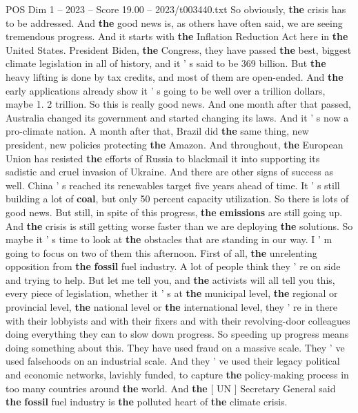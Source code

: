 \begin{textsample}{POS Dim 1 – 2023 – Score 19.00 – 2023/t003440.txt}
So obviously, \textbf{the} crisis has to be addressed.
And \textbf{the} good news is, as others have often said, we are seeing tremendous progress.
And it starts with \textbf{the} Inflation Reduction Act here in \textbf{the} United States.
President Biden, \textbf{the} Congress, they have passed \textbf{the} best, biggest climate legislation in all of history, and it ' s said to be 369 billion.
But \textbf{the} heavy lifting is done by tax credits, and most of them are open-ended.
And \textbf{the} early applications already show it ' s going to be well over a trillion dollars, maybe 1. 2 trillion.
So this is really good news.
And one month after that passed, Australia changed its government and started changing its laws.
And it ' s now a pro-climate nation.
A month after that, Brazil did \textbf{the} same thing, new president, new policies protecting \textbf{the} Amazon.
And throughout, \textbf{the} European Union has resisted \textbf{the} efforts of Russia to blackmail it into supporting its sadistic and cruel invasion of Ukraine.
And there are other signs of success as well.
China ' s reached its renewables target five years ahead of time.
It ' s still building a lot of \textbf{coal}, but only 50 percent capacity utilization.
So there is lots of good news.
But still, in spite of this progress, \textbf{the} \textbf{emissions} are still going up.
And \textbf{the} crisis is still getting worse faster than we are deploying \textbf{the} solutions.
So maybe it ' s time to look at \textbf{the} obstacles that are standing in our way.
I ' m going to focus on two of them this afternoon.
First of all, \textbf{the} unrelenting opposition from \textbf{the} \textbf{fossil} fuel industry.
A lot of people think they ' re on side and trying to help.
But let me tell you, and \textbf{the} activists will all tell you this, every piece of legislation, whether it ' s at \textbf{the} municipal level, \textbf{the} regional or provincial level, \textbf{the} national level or \textbf{the} international level, they ' re in there with their lobbyists and with their fixers and with their revolving-door colleagues doing everything they can to slow down progress.
So speeding up progress means doing something about this.
They have used fraud on a massive scale.
They ' ve used falsehoods on an industrial scale.
And they ' ve used their legacy political and economic networks, lavishly funded, to capture \textbf{the} policy-making process in too many countries around \textbf{the} world.
And \textbf{the} [ UN ] Secretary General said \textbf{the} \textbf{fossil} fuel industry is \textbf{the} polluted heart of \textbf{the} climate crisis.

\end{textsample}
